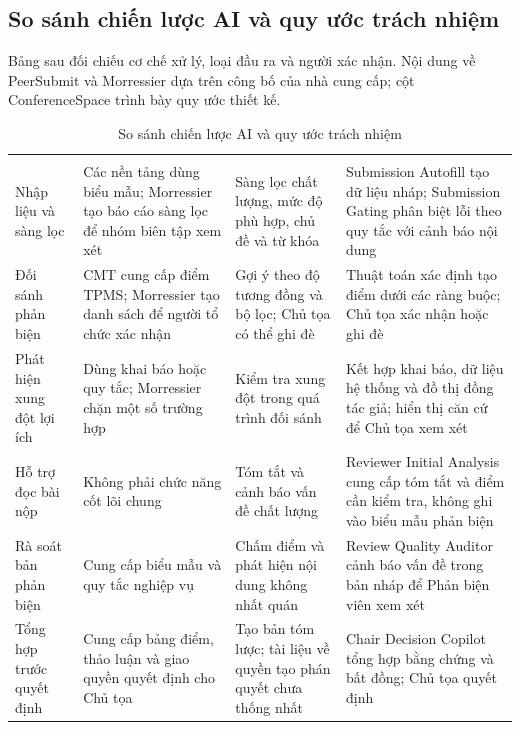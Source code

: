 \subsection{So sánh chiến lược AI và quy ước trách nhiệm}

Bảng sau đối chiếu cơ chế xử lý, loại đầu ra và người xác nhận. Nội dung về PeerSubmit và Morressier dựa trên công bố của nhà cung cấp; cột ConferenceSpace trình bày quy ước thiết kế.

\begingroup
\setlength{\tabcolsep}{2pt}
\setlength{\LTleft}{0pt plus \textwidth}
\setlength{\LTright}{0pt plus \textwidth}
\begin{longtable}{|P{0.16\textwidth}|P{0.24\textwidth}|P{0.27\textwidth}|P{0.27\textwidth}|}
  \caption{So sánh chiến lược AI và quy ước trách nhiệm}\\
\hline
{} &  &  &  \\ \hline
\endfirsthead
\hline
{} &  &  &  \\ \hline
\endhead
\hline
\endfoot
Nhập liệu và sàng lọc & Các nền tảng dùng biểu mẫu; Morressier tạo báo cáo sàng lọc để nhóm biên tập xem xét & Sàng lọc chất lượng, mức độ phù hợp, chủ đề và từ khóa & Submission Autofill tạo dữ liệu nháp; Submission Gating phân biệt lỗi theo quy tắc với cảnh báo nội dung \\ \hline
Đối sánh phản biện & CMT cung cấp điểm TPMS; Morressier tạo danh sách để người tổ chức xác nhận & Gợi ý theo độ tương đồng và bộ lọc; Chủ tọa có thể ghi đè & Thuật toán xác định tạo điểm dưới các ràng buộc; Chủ tọa xác nhận hoặc ghi đè \\ \hline
Phát hiện xung đột lợi ích & Dùng khai báo hoặc quy tắc; Morressier chặn một số trường hợp & Kiểm tra xung đột trong quá trình đối sánh & Kết hợp khai báo, dữ liệu hệ thống và đồ thị đồng tác giả; hiển thị căn cứ để Chủ tọa xem xét \\ \hline
Hỗ trợ đọc bài nộp & Không phải chức năng cốt lõi chung & Tóm tắt và cảnh báo vấn đề chất lượng & Reviewer Initial Analysis cung cấp tóm tắt và điểm cần kiểm tra, không ghi vào biểu mẫu phản biện \\ \hline
Rà soát bản phản biện & Cung cấp biểu mẫu và quy tắc nghiệp vụ & Chấm điểm và phát hiện nội dung không nhất quán & Review Quality Auditor cảnh báo vấn đề trong bản nháp để Phản biện viên xem xét \\ \hline
Tổng hợp trước quyết định & Cung cấp bảng điểm, thảo luận và giao quyền quyết định cho Chủ tọa & Tạo bản tóm lược; tài liệu về quyền tạo phán quyết chưa thống nhất & Chair Decision Copilot tổng hợp bằng chứng và bất đồng; Chủ tọa quyết định \\ \hline
\end{longtable}
\endgroup

